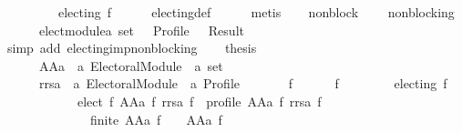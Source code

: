 \begin{isabellebody}
\ \ \ \ \ \ \ \ {\isasymnot}\ electing\ f{\isacharparenright}{\kern0pt}{\isachardoublequoteclose}\isanewline
\ \ \ \ \isamarkupfalse%
\ electing{\isacharunderscore}{\kern0pt}def\isanewline
\ \ \ \ \isamarkupfalse%
\ metis\isanewline
\ \ \isamarkupfalse%
\ non{\isacharunderscore}{\kern0pt}block{\isacharcolon}{\kern0pt}\isanewline
\ \ \ \ {\isachardoublequoteopen}non{\isacharunderscore}{\kern0pt}blocking\isanewline
\ \ \ \ \ \ {\isacharparenleft}{\kern0pt}elect{\isacharunderscore}{\kern0pt}module{\isacharcolon}{\kern0pt}{\isacharcolon}{\kern0pt}{\isacharprime}{\kern0pt}a\ set\ {\isasymRightarrow}\ {\isacharunderscore}{\kern0pt}\ Profile\ {\isasymRightarrow}\ {\isacharunderscore}{\kern0pt}\ Result{\isacharparenright}{\kern0pt}{\isachardoublequoteclose}\isanewline
\ \ \ \ \isamarkupfalse%
\ {\isacharparenleft}{\kern0pt}simp\ add{\isacharcolon}{\kern0pt}\ electing{\isacharunderscore}{\kern0pt}imp{\isacharunderscore}{\kern0pt}non{\isacharunderscore}{\kern0pt}blocking{\isacharparenright}{\kern0pt}\isanewline
\ \ \isamarkupfalse%
\ {\isacharquery}{\kern0pt}thesis\isanewline
\ \ \ \ \isanewline
\ \ \isamarkupfalse%
\ {\isacharminus}{\kern0pt}\isanewline
\ \ \ \ \isamarkupfalse%
\isanewline
\ \ \ \ \ \ AAa\ {\isacharcolon}{\kern0pt}{\isacharcolon}{\kern0pt}\ {\isachardoublequoteopen}{\isacharprime}{\kern0pt}a\ Electoral{\isacharunderscore}{\kern0pt}Module\ {\isasymRightarrow}\ {\isacharprime}{\kern0pt}a\ set{\isachardoublequoteclose}\ \isanewline
\ \ \ \ \ \ rrsa\ {\isacharcolon}{\kern0pt}{\isacharcolon}{\kern0pt}\ {\isachardoublequoteopen}{\isacharprime}{\kern0pt}a\ Electoral{\isacharunderscore}{\kern0pt}Module\ {\isasymRightarrow}\ {\isacharprime}{\kern0pt}a\ Profile{\isachardoublequoteclose}\ \isanewline
\ \ \ \ \ \ f{}{\isacharcolon}{\kern0pt}\isanewline
\ \ \ \ \ \ {\isachardoublequoteopen}{\isasymforall}f{\isachardot}{\kern0pt}\isanewline
\ \ \ \ \ \ \ \ {\isacharparenleft}{\kern0pt}electing\ f\ {\isasymor}\isanewline
\ \ \ \ \ \ \ \ \ \ {\isacharbraceleft}{\kern0pt}{\isacharbraceright}{\kern0pt}\ {\isacharequal}{\kern0pt}\ elect\ f\ {\isacharparenleft}{\kern0pt}AAa\ f{\isacharparenright}{\kern0pt}\ {\isacharparenleft}{\kern0pt}rrsa\ f{\isacharparenright}{\kern0pt}\ {\isasymand}\ profile\ {\isacharparenleft}{\kern0pt}AAa\ f{\isacharparenright}{\kern0pt}\ {\isacharparenleft}{\kern0pt}rrsa\ f{\isacharparenright}{\kern0pt}\ {\isasymand}\isanewline
\ \ \ \ \ \ \ \ \ \ \ \ \ \ finite\ {\isacharparenleft}{\kern0pt}AAa\ f{\isacharparenright}{\kern0pt}\ {\isasymand}\ {\isacharbraceleft}{\kern0pt}{\isacharbraceright}{\kern0pt}\ {\isasymnoteq}\ AAa\ f\ {\isasymor}\isanewline

\end{isabellebody}
